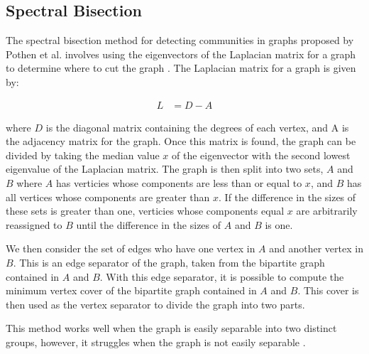 \documentclass{article}
\begin{document}
    \subsection{Spectral Bisection}
    The spectral bisection method for detecting communities in graphs proposed by Pothen et al. involves using the eigenvectors of the Laplacian matrix for a graph to determine where to cut the graph \cite{doi:10.1137/0611030}. The Laplacian matrix for a graph is given by:

    \begin{align}
        L &= D - A
    \end{align}

    where $D$ is the diagonal matrix containing the degrees of each vertex, and A is the adjacency matrix for the graph. Once this matrix is found, the graph can be divided by taking the median value $x$ of the eigenvector with the second lowest eigenvalue of the Laplacian matrix. The graph is then split into two sets, $A$ and $B$ where $A$ has verticies whose components are less than or equal to $x$, and $B$ has all vertices whose components are greater than $x$. If the difference in the sizes of these sets is greater than one, verticies whose components equal $x$ are arbitrarily reassigned to $B$ until the difference in the sizes of $A$ and $B$ is one.
    \par
    We then consider the set of edges who have one vertex in $A$ and another vertex in $B$. This is an edge separator of the graph, taken from the bipartite graph contained in $A$ and $B$. With this edge separator, it is possible to compute the minimum vertex cover of the bipartite graph contained in $A$ and $B$. This cover is then used as the vertex separator to divide the graph into two parts.
    \par
    This method works well when the graph is easily separable into two distinct groups, however, it struggles when the graph is not easily separable \cite{Newman2004}.
\end{document}
